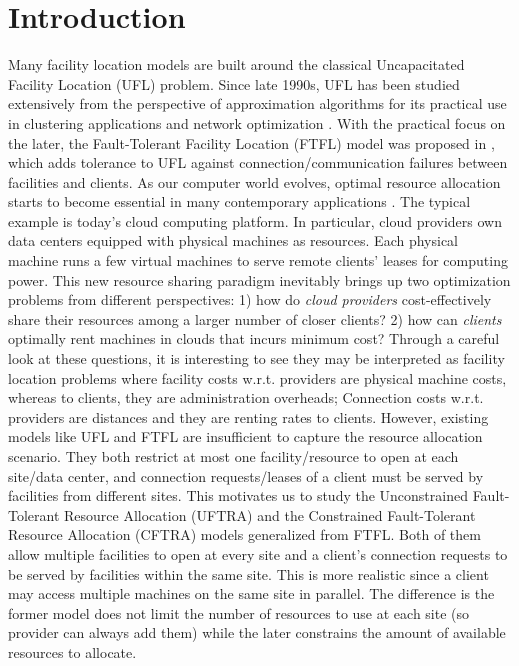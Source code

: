 \documentclass[10pt]{llncs}
\begin{document}
\section{Introduction}

Many facility location models are built around the classical Uncapacitated
Facility Location (UFL) problem. Since late 1990s, UFL has been studied
extensively from the perspective of approximation algorithms for its
practical use in clustering applications and network optimization
\cite{jain01approximation}. With the practical focus on the later,
the Fault-Tolerant Facility Location (FTFL) model was proposed in
\cite{Jain00FTFL}, which adds tolerance to UFL against connection/communication
failures between facilities and clients. As our computer world evolves,
optimal resource allocation starts to become essential in many contemporary
applications \cite{chang2010optimal}. The typical example is today's
cloud computing platform. In particular, cloud providers own data
centers equipped with physical machines as resources. Each physical
machine runs a few virtual machines to serve remote clients' leases
for computing power. This new resource sharing paradigm inevitably
brings up two optimization problems from different perspectives: 1)
how do \textit{cloud providers} cost-effectively share their resources
among a larger number of closer clients? 2) how can \textit{clients}
optimally rent machines in clouds that incurs minimum cost? Through
a careful look at these questions, it is interesting to see they may
be interpreted as facility location problems where facility costs
w.r.t. providers are physical machine costs, whereas to clients, they
are administration overheads; Connection costs w.r.t. providers are
distances and they are renting rates to clients. However, existing
models like UFL and FTFL are insufficient to capture the resource
allocation scenario. They both restrict at most one facility/resource
to open at each site/data center, and connection requests/leases of
a client must be served by facilities from different sites. This motivates
us to study the Unconstrained Fault-Tolerant Resource Allocation (UFTRA)
and the Constrained Fault-Tolerant Resource Allocation (CFTRA) models
generalized from FTFL. Both of them allow multiple facilities to open
at every site and a client's connection requests to be served by facilities
within the same site. This is more realistic since a client may access
multiple machines on the same site in parallel. The difference is
the former model does not limit the number of resources to use at
each site (so provider can always add them) while the later constrains
the amount of available resources to allocate. 
\end{document}
